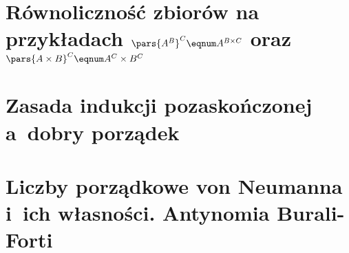 \section{Równoliczność zbiorów na przykładach \texorpdfstring{\(\pars{A^B}^C \eqnum A^{B \times C}\)}{(A\^B)\^C ~ A\^(B x C)} oraz \texorpdfstring{\(\pars{A \times B}^C \eqnum A^C \times B^C\)}{(A x B)\^C ~ A\^C x B\^C}}
\label{mfi:equinumerosity}


\section{Zasada indukcji pozaskończonej a~dobry porządek}

\section{Liczby porządkowe von Neumanna i~ich własności. Antynomia Burali-Forti}
